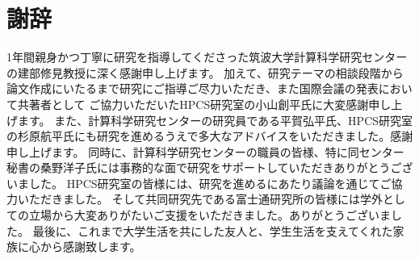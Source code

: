 \documentclass[a4paper,11pt]{jreport}
\begin{document}
\chapter*{謝辞}
1年間親身かつ丁寧に研究を指導してくださった筑波大学計算科学研究センターの建部修見教授に深く感謝申し上げます。
加えて、研究テーマの相談段階から論文作成にいたるまで研究にご指導ご尽力いただき、また国際会議の発表において共著者として
ご協力いただいたHPCS研究室の小山創平氏に大変感謝申し上げます。
また、計算科学研究センターの研究員である平賀弘平氏、HPCS研究室の杉原航平氏にも研究を進めるうえで多大なアドバイスをいただきました。感謝申し上げます。
同時に、計算科学研究センターの職員の皆様、特に同センター秘書の桑野洋子氏には事務的な面で研究をサポートしていただきありがとうございました。
HPCS研究室の皆様には、研究を進めるにあたり議論を通じてご協力いただきました。
そして共同研究先である富士通研究所の皆様には学外としての立場から大変ありがたいご支援をいただきました。ありがとうございました。
最後に、これまで大学生活を共にした友人と、学生生活を支えてくれた家族に心から感謝致します。

\newpage

\renewcommand{\bibname}{参考文献}



\end{document}
